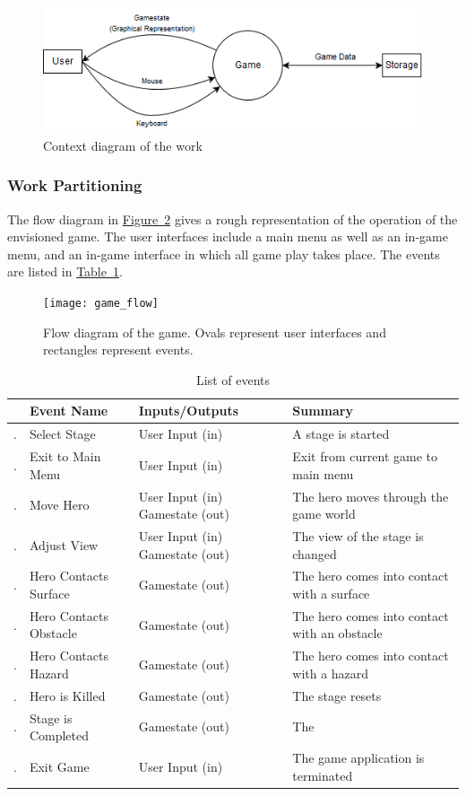 \documentclass[12pt, titlepage]{article}
\newcounter{EventList}
\newcommand{\printEvent}{
    \stepcounter{EventList}
    \arabic{EventList}.
}
\begin{document}
\begin{figure}[hb]
\includegraphics[width=\textwidth]{context}
\caption{Context diagram of the work} \label{fig:context}
\end{figure}


\subsubsection{Work Partitioning}
The flow diagram in \hyperref[fig:gameflow]{Figure~\ref*{fig:gameflow}} gives a rough representation of the operation of the envisioned game.  The user interfaces include a main menu as well as an in-game menu, and an in-game interface in which all game play takes place.  The events are listed in \hyperref[tab:events]{Table~\ref*{tab:events}}.
\begin{figure}
\texttt{[image: game\_flow]}
\caption[Flow diagram of the game]{Flow diagram of the game.  Ovals represent user interfaces and rectangles represent events.} \label{fig:gameflow}
\end{figure}

\begin{table}
\caption{List of events} \label{tab:events}
\begin{tabularx}{\textwidth}{p{0.5cm}>{\raggedright}p{3cm}>{\raggedright}p{3.5cm}>{\raggedright\arraybackslash}X}
\toprule & {\bf Event Name} & {\bf Inputs/Outputs} & {\bf Summary}\\
\midrule
\printEvent & Select Stage & User Input (in) & A stage is started\\
\printEvent & Exit to Main Menu & User Input (in) & Exit from current game to main menu\\
\printEvent & Move Hero & User Input (in) Gamestate (out) & The hero moves through the game world\\
\printEvent & Adjust View & User Input (in) Gamestate (out) & The view of the stage is changed\\
\printEvent & Hero Contacts Surface & Gamestate (out) & The hero comes into contact with a surface\\
\printEvent & Hero Contacts Obstacle & Gamestate (out) & The hero comes into contact with an obstacle\\
\printEvent & Hero Contacts Hazard & Gamestate (out) & The hero comes into contact with a hazard\\
\printEvent & Hero is Killed & Gamestate (out) & The stage resets\\
\printEvent & Stage is Completed & Gamestate (out) & The\\
\printEvent & Exit Game & User Input (in) & The game application is terminated\\
\bottomrule
\end{tabularx}
\end{table}
\end{document}
